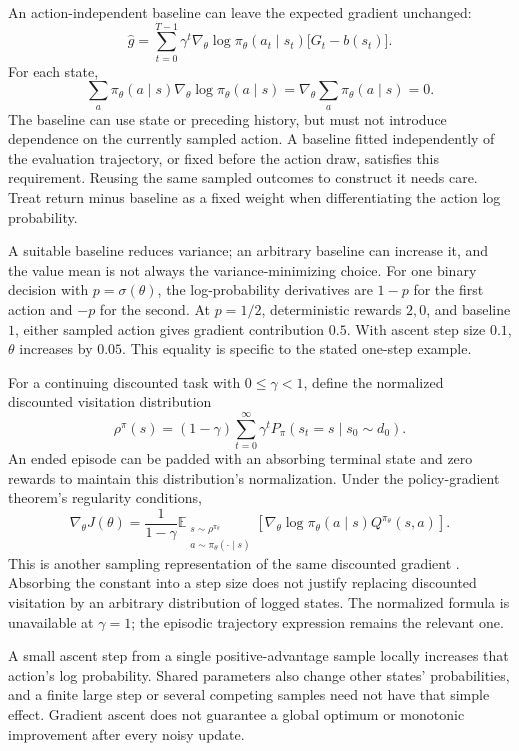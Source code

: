 An action-independent baseline can leave the expected gradient unchanged:
\[
\hat g=\sum_{t=0}^{T-1}\gamma^t
\nabla_\theta\log\pi_\theta(a_t\mid s_t)
\bigl[G_t-b(s_t)\bigr].
\]
For each state,
\[
\sum_a\pi_\theta(a\mid s)\nabla_\theta\log\pi_\theta(a\mid s)
=\nabla_\theta\sum_a\pi_\theta(a\mid s)=0.
\]
The baseline can use state or preceding history, but must not introduce dependence on the currently sampled action. A baseline fitted independently of the evaluation trajectory, or fixed before the action draw, satisfies this requirement. Reusing the same sampled outcomes to construct it needs care. Treat return minus baseline as a fixed weight when differentiating the action log probability.

A suitable baseline reduces variance; an arbitrary baseline can increase it, and the value mean is not always the variance-minimizing choice. For one binary decision with $p=\sigma(\theta)$, the log-probability derivatives are $1-p$ for the first action and $-p$ for the second. At $p=1/2$, deterministic rewards $2,0$, and baseline $1$, either sampled action gives gradient contribution $0.5$. With ascent step size $0.1$, $\theta$ increases by $0.05$. This equality is specific to the stated one-step example.

For a continuing discounted task with $0\le\gamma<1$, define the normalized discounted visitation distribution
\[
\rho^\pi(s)=(1-\gamma)\sum_{t=0}^\infty
\gamma^tP_\pi(s_t=s\mid s_0\sim d_0).
\]
An ended episode can be padded with an absorbing terminal state and zero rewards to maintain this distribution's normalization. Under the policy-gradient theorem's regularity conditions,
\[
\nabla_\theta J(\theta)=\frac1{1-\gamma}
\mathbb E_{\substack{s\sim\rho^{\pi_\theta}\\a\sim\pi_\theta(\cdot\mid s)}}
\left[\nabla_\theta\log\pi_\theta(a\mid s)
Q^{\pi_\theta}(s,a)\right].
\]
This is another sampling representation of the same discounted gradient \citep{sutton2000policy}. Absorbing the constant into a step size does not justify replacing discounted visitation by an arbitrary distribution of logged states. The normalized formula is unavailable at $\gamma=1$; the episodic trajectory expression remains the relevant one.

A small ascent step from a single positive-advantage sample locally increases that action's log probability. Shared parameters also change other states' probabilities, and a finite large step or several competing samples need not have that simple effect. Gradient ascent does not guarantee a global optimum or monotonic improvement after every noisy update.

